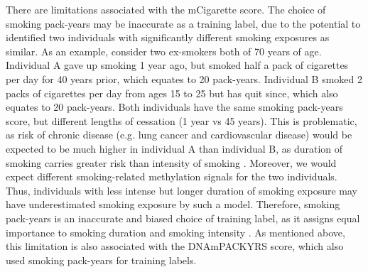 \documentclass{article} %
\begin{document}
There are limitations associated with the mCigarette score. The choice of smoking pack-years may be inaccurate as a training label, due to the potential to identified two individuals with significantly different smoking exposures as similar. As an example, consider two ex-smokers both of 70 years of age. Individual A gave up smoking 1 year ago, but smoked half a pack of cigarettes per day for 40 years prior, which equates to 20 pack-years. Individual B smoked 2 packs of cigarettes per day from ages 15 to 25 but has quit since, which also equates to 20 pack-years. Both individuals have the same smoking pack-years score, but different lengths of cessation (1 year vs 45 years). This is problematic, as risk of chronic disease (e.g. lung cancer and cardiovascular disease) would be expected to be much higher in individual A than individual B, as duration of smoking carries greater risk than intensity of smoking \cite{remen2018risk, flanders2003lung, lubin2006cigarette, doll1978cigarette}. Moreover, we would expect different smoking-related methylation signals for the two individuals. Thus, individuals with less intense but longer duration of smoking exposure may have underestimated smoking exposure by such a model. Therefore, smoking pack-years is an inaccurate and biased choice of training label, as it assigns equal importance to smoking duration and smoking intensity \cite{potter2024pack}. As mentioned above, this limitation is also associated with the DNAmPACKYRS score, which also used smoking pack-years for training labels.

\end{document}
